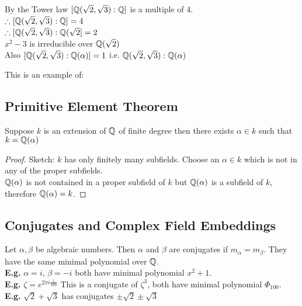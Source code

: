 \documentclass[11pt]{article}
\begin{document}
By the Tower law $[\mathbb{Q}(\sqrt{2},\sqrt{3}): \mathbb{Q}]$ is a multiple of 4.
$ $\\[-.5em]

$ \therefore [\mathbb{Q}(\sqrt{2},\sqrt{3}): \mathbb{Q}] = 4$
$ $\\[-.5em]

$ \therefore [\mathbb{Q}(\sqrt{2},\sqrt{3}): \mathbb{Q}(\sqrt{2}] = 2$
$ $\\[-0.5em]

$x^2 - 3$ is irreducible over $\mathbb{Q}(\sqrt{2})$
$ $\\[-0.5em]

Also $ [\mathbb{Q}(\sqrt{2},\sqrt{3}): \mathbb{Q}(\alpha)] = 1$ i.e. $\mathbb{Q}(\sqrt{2},\sqrt{3}): \mathbb{Q}(\alpha)$

$ $\\[-.5em]
This is an example of:

\subsection{Primitive Element Theorem}
\begin{theorem}
	Suppose $k$ is an extension of $\mathbb{Q}$ of finite degree then there exists $\alpha \in k$ such that $k = \mathbb{Q}(\alpha)$
\end{theorem}

\begin{proof}
	Sketch: $k$ has only finitely many subfields.
	Choose an $\alpha \in k$ which is not in any of the proper subfields.
	$ $\\
	
	$\mathbb{Q} (\alpha)$ is not contained in a proper subfield of $k$ but $\mathbb{Q}(\alpha)$ is a subfield of $k$, therefore $\mathbb{Q}(\alpha) = k$.
\end{proof}

\subsection{Conjugates and Complex Field Embeddings}

Let $\alpha, \beta $ be algebraic numbers.
Then $\alpha$ and $\beta$ are conjugates if $m_\alpha = m_\beta$. They have the same minimal polynomial over $\mathbb{Q}$.
$ $\\[1em]
\textbf{E.g.} $\alpha = i$, $\beta = -i$ both have minimal polynomial $x^2 + 1$.\\
\textbf{E.g.} $\zeta = e^{2 \pi i \frac{1}{100}} $ This is a conjugate of $\zeta^3$, both have minimal polynomial $\Phi_{100}$.\\
\textbf{E.g.} $\sqrt{2} + \sqrt{3}$ has conjugates $\pm \sqrt{2} \pm \sqrt{3}$
\end{document}
